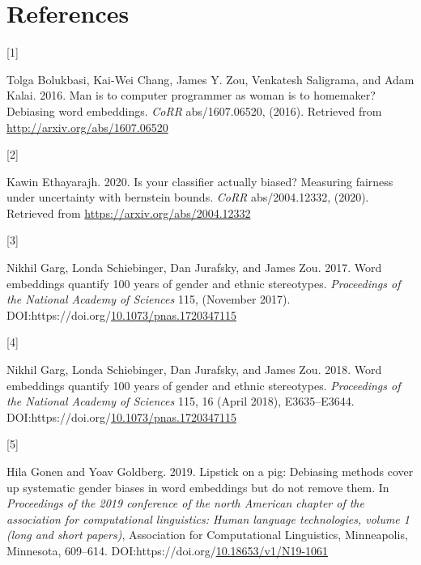 \documentclass[
  12pt,
  dvipsnames,enabledeprecatedfontcommands]{scrartcl}
\newlength{\cslhangindent}
\newlength{\csllabelwidth}
\newlength{\cslentryspacingunit} %
\newenvironment{CSLReferences}[2] %
 {%
  \setlength{\parindent}{0pt}
  \ifodd #1
  \let\oldpar\par
  \def\par{\hangindent=\cslhangindent\oldpar}
  \fi
  \setlength{\parskip}{#2\cslentryspacingunit}
 }%
 {}
\newcommand{\CSLLeftMargin}[1]{\parbox[t]{\csllabelwidth}{#1}}
\newcommand{\CSLRightInline}[1]{\parbox[t]{\linewidth - \csllabelwidth}{#1}\break}
\begin{document}
\newpage

\hypertarget{references}{%
\section*{References}\label{references}}

\hypertarget{refs}{}
\begin{CSLReferences}{0}{0}
\leavevmode{}%
\CSLLeftMargin{{[}1{]} }%
\CSLRightInline{Tolga Bolukbasi, Kai-Wei Chang, James Y. Zou, Venkatesh
Saligrama, and Adam Kalai. 2016. Man is to computer programmer as woman
is to homemaker? Debiasing word embeddings. \emph{CoRR} abs/1607.06520,
(2016). Retrieved from \url{http://arxiv.org/abs/1607.06520}}

\leavevmode{}%
\CSLLeftMargin{{[}2{]} }%
\CSLRightInline{Kawin Ethayarajh. 2020. Is your classifier actually
biased? Measuring fairness under uncertainty with bernstein bounds.
\emph{CoRR} abs/2004.12332, (2020). Retrieved from
\url{https://arxiv.org/abs/2004.12332}}

\leavevmode{}%
\CSLLeftMargin{{[}3{]} }%
\CSLRightInline{Nikhil Garg, Londa Schiebinger, Dan Jurafsky, and James
Zou. 2017. Word embeddings quantify 100 years of gender and ethnic
stereotypes. \emph{Proceedings of the National Academy of Sciences} 115,
(November 2017).
DOI:https://doi.org/\href{https://doi.org/10.1073/pnas.1720347115}{10.1073/pnas.1720347115}}

\leavevmode{}%
\CSLLeftMargin{{[}4{]} }%
\CSLRightInline{Nikhil Garg, Londa Schiebinger, Dan Jurafsky, and James
Zou. 2018. Word embeddings quantify 100 years of gender and ethnic
stereotypes. \emph{Proceedings of the National Academy of Sciences} 115,
16 (April 2018), E3635--E3644.
DOI:https://doi.org/\href{https://doi.org/10.1073/pnas.1720347115}{10.1073/pnas.1720347115}}

\leavevmode{}%
\CSLLeftMargin{{[}5{]} }%
\CSLRightInline{Hila Gonen and Yoav Goldberg. 2019. Lipstick on a pig:
{D}ebiasing methods cover up systematic gender biases in word embeddings
but do not remove them. In \emph{Proceedings of the 2019 conference of
the north {A}merican chapter of the association for computational
linguistics: Human language technologies, volume 1 (long and short
papers)}, Association for Computational Linguistics, Minneapolis,
Minnesota, 609--614.
DOI:https://doi.org/\href{https://doi.org/10.18653/v1/N19-1061}{10.18653/v1/N19-1061}}


\end{CSLReferences}
\end{document}
